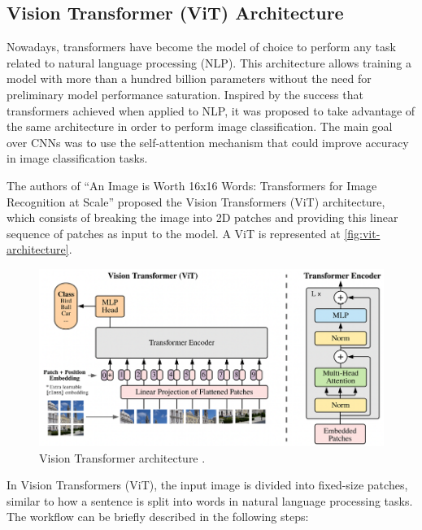 \subsection*{Vision Transformer (ViT) Architecture}

Nowadays, transformers have become the model of choice to perform any task related to natural language processing (NLP). This architecture allows training a model with more than a hundred billion parameters without the need for preliminary model performance saturation. Inspired by the success that transformers achieved when applied to NLP, it was proposed to take advantage of the same architecture in order to perform image classification. The main goal over CNNs was to use the self-attention mechanism that could improve accuracy in image classification tasks.

The authors of \enquote{An Image is Worth 16x16 Words: Transformers for Image Recognition at Scale} \cite{dosovitskiy2021imageworth16x16words} proposed the Vision Transformers (ViT) architecture, which consists of breaking the image into 2D patches and providing this linear sequence of patches as input to the model. A ViT is represented at \autoref{fig:vit-architecture}.

\begin{figure}[htbp]
    \centering
    \includegraphics[width=0.8\linewidth]{obrazky-figures/02-theoretical-basis/vit-architecture.png}
    \caption{Vision Transformer architecture \cite{dosovitskiy2021imageworth16x16words}.}
    \label{fig:vit-architecture}
\end{figure}

In Vision Transformers (ViT), the input image is divided into fixed-size patches, similar to how a sentence is split into words in natural language processing tasks. The workflow can be briefly described in the following steps:

